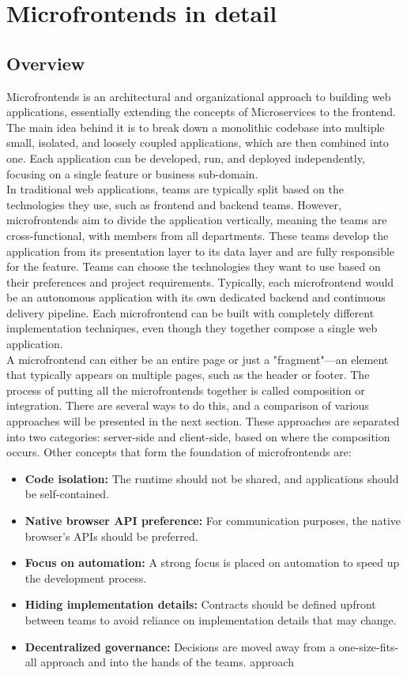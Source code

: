 \section{Microfrontends in detail}
\subsection{Overview}
Microfrontends is an architectural and organizational approach to building web applications, essentially extending the concepts of Microservices to the frontend. The main idea behind it is to break down a monolithic codebase into multiple small, isolated, and loosely coupled applications, which are then combined into one. Each application can be developed, run, and deployed independently, focusing on a single feature or business sub-domain. \\

\noindent
In traditional web applications, teams are typically split based on the technologies they use, such as frontend and backend teams. However, microfrontends aim to divide the application vertically, meaning the teams are cross-functional, with members from all departments. These teams develop the application from its presentation layer to its data layer and are fully responsible for the feature. Teams can choose the technologies they want to use based on their preferences and project requirements. Typically, each microfrontend would be an autonomous application with its own dedicated backend and continuous delivery pipeline. Each microfrontend can be built with completely different implementation techniques, even though they together compose a single web application. \\

\noindent
A microfrontend can either be an entire page or just a "fragment"—an element that typically appears on multiple pages, such as the header or footer. The process of putting all the microfrontends together is called composition or integration. There are several ways to do this, and a comparison of various approaches will be presented in the next section. These approaches are separated into two categories: server-side and client-side, based on where the composition occurs. Other concepts that form the foundation of microfrontends are:
\begin{itemize}
    \item \textbf{Code isolation:} The runtime should not be shared, and applications should be self-contained.
    \item \textbf{Native browser API preference:} For communication purposes, the native browser’s APIs should be preferred. 
    \item \textbf{Focus on automation:} A strong focus is placed on automation to speed up the development process.
    \item \textbf{Hiding implementation details:} Contracts should be defined upfront between teams to avoid reliance on implementation details that may change.
    \item \textbf{Decentralized governance:} Decisions are moved away from a one-size-fits-all approach and into the hands of the teams.
    approach
\end{itemize}

